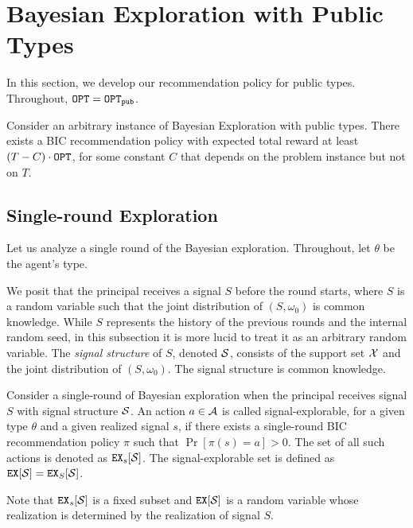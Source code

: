 
\section{Bayesian Exploration with Public Types}
\label{sec:public}

In this section, we develop our recommendation policy for public types. Throughout, $\OPT = \OPTpub$.

\begin{theorem}
\label{thm:public}
Consider an arbitrary instance of Bayesian Exploration with public types. 
There exists a BIC recommendation policy with expected total reward at least $\left(T - C \right) \cdot \OPT$, for some constant $C$ that depends on the problem instance but not on $T$.
\end{theorem}

\subsection{Single-round Exploration}
\label{sec:public_single}

Let us analyze a single round of the Bayesian exploration. Throughout, let $\theta$ be the agent's type.

We posit that the principal receives a signal $S$ before the round starts, where $S$ is a random variable such that the joint distribution of $(S,\omega_0)$ is common knowledge. While $S$ represents the history of the previous rounds and the internal random seed, in this subsection it is more lucid to treat it as an arbitrary random variable. The \emph{signal structure} of $S$, denoted $\S$, consists of the support set $\X$ and the joint distribution of $(S, \omega_0)$. The signal structure is common knowledge.


\begin{definition}
Consider a single-round of Bayesian exploration when the principal receives signal $S$ with signal structure $\S$. An action $a \in \A$ is called signal-explorable, for a given type $\theta$ and a given realized signal $s$, if there exists a single-round BIC recommendation policy $\pi$ such that $\Pr[\pi(s) = a] > 0$. The set of all such actions is denoted as $\EX_s[\S]$. The signal-explorable set is defined as $\EX[\S] = \EX_S[\S]$.
\end{definition}

Note that $\EX_s[\S]$ is a fixed subset and $\EX[\S]$ is a random variable whose realization is determined by the realization of signal $S$.

